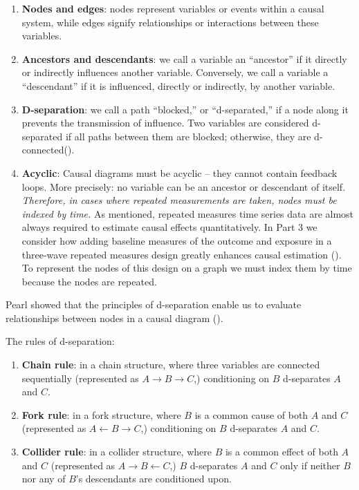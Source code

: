 \documentclass[
  singlecolumn]{article}
\begin{document}
\begin{enumerate}
\def\labelenumi{\arabic{enumi}.}
\item
  \textbf{Nodes and edges}: nodes represent variables or events within a
  causal system, while edges signify relationships or interactions
  between these variables.
\item
  \textbf{Ancestors and descendants}: we call a variable an ``ancestor''
  if it directly or indirectly influences another variable. Conversely,
  we call a variable a ``descendant'' if it is influenced, directly or
  indirectly, by another variable.
\item
  \textbf{D-separation}: we call a path ``blocked,'' or ``d-separated,''
  if a node along it prevents the transmission of influence. Two
  variables are considered d-separated if all paths between them are
  blocked; otherwise, they are
  d-connected().
\item
  \textbf{Acyclic}: Causal diagrams must be acyclic -- they cannot
  contain feedback loops. More precisely: no variable can be an ancestor
  or descendant of itself. \emph{Therefore, in cases where repeated
  measurements are taken, nodes must be indexed by time.} As mentioned,
  repeated measures time series data are almost always required to
  estimate causal effects quantitatively. In Part 3 we consider how
  adding baseline measures of the outcome and exposure in a three-wave
  repeated measures design greatly enhances causal estimation
  (). To represent the nodes of this
  design on a graph we must index them by time because the nodes are
  repeated.
\end{enumerate}

Pearl showed that the principles of d-separation enable us to evaluate
relationships between nodes in a causal diagram
().

The rules of d-separation:

\begin{enumerate}
\def\labelenumi{\alph{enumi}.}
\item
  \textbf{Chain rule}: in a chain structure, where three variables are
  connected sequentially (represented as
  \(A \rightarrow B \rightarrow C\),) conditioning on \(B\) d-separates
  \(A\) and \(C\).
\item
  \textbf{Fork rule}: in a fork structure, where \(B\) is a common cause
  of both \(A\) and \(C\) (represented as
  \(A \leftarrow B \rightarrow C\),) conditioning on \(B\) d-separates
  \(A\) and \(C\).
\item
  \textbf{Collider rule}: in a collider structure, where \(B\) is a
  common effect of both \(A\) and \(C\) (represented as
  \(A \rightarrow B \leftarrow C\),) \(B\) d-separates \(A\) and \(C\)
  only if neither \(B\) nor any of \(B\)'s descendants are conditioned
  upon.
\end{enumerate}
\end{document}
